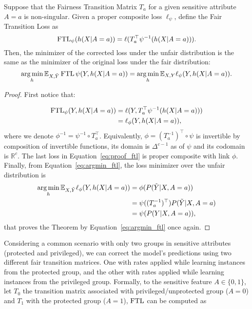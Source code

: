 \begin{theorem}\label{theorem:ftl}
    Suppose that the Fairness Transition Matrix $T_a$ for a given sensitive attribute $A=a$ is non-singular. Given a proper composite loss $\ell_{\psi}$, define the Fair Transition Loss as
    \[\operatorname{FTL}_{\psi}(h(X|A=a)) = \ell(T^{\top}_a \psi^{-1}(h(X|A=a))).\]
    Then, the minimizer of the corrected loss under the unfair distribution is the same as the minimizer of the original loss under the fair distribution:
    \[  \operatorname*{arg\,min}\limits_{h}\mathbb{E}_{X,\tilde{Y}}\operatorname{FTL}{\psi}(Y, h(X|A=a)) = \operatorname*{arg\,min}\limits_{h}\mathbb{E}_{X,Y}\ell_{\psi}(Y, h(X|A=a)).\]
\end{theorem}
\begin{proof}
    First notice that:

    \begin{align} \label{eq:proof_ftl}
        \operatorname{FTL}_{\psi}(Y, h(X|A=a)) &= \ell(Y, T^{\top}_a \psi^{-1}(h(X|A=a))) \nonumber \\
        &= \ell_{\phi}(Y, h(X|A=a)),
    \end{align}
    where we denote $\phi^{-1} = \psi^{-1} \circ T_a^{\top}$. Equivalently, $\phi = (T_a^{-1})^{\top} \circ \psi$ is invertible by composition of invertible functions, its domain is $\Delta^{c-1}$ as of $\psi$ and its codomain is $\mathbb{R}^{c}$. The last loss in Equation~\ref{eq:proof_ftl} is proper composite with link $\phi$. Finally, from Equation~\ref{eq:argmin_ftl}, the loss minimizer over the unfair distribution is
    \begin{align}
        \operatorname*{arg\,min}\limits_{h}\mathbb{E}_{X,\tilde{Y}}\ell_{\phi}(Y, h(X|A=a)) &= \phi(P(\tilde{Y}|X,A=a)) \\
        &= \psi((T_a^{-1})^{\top}) P(\tilde{Y}|X,A=a) \\
        &= \psi(P(Y|X,A=a)),
    \end{align}
    that proves the Theorem by Equation~\ref{eq:argmin_ftl} once again.
\end{proof}

Considering a common scenario with only two groups in sensitive attributes (protected and privileged), we can correct the model's predictions using two different fair transition matrices. One with rates applied while learning instances from the protected group, and the other with rates applied while learning instances from the privileged group. Formally, to the sensitive feature $A \in \{0,1\}$, let $T_0$ the transition matrix associated with privileged/unprotected group ($A = 0$) and $T_1$ with the protected group ($A = 1$), $\operatorname{FTL}$ can be computed as

